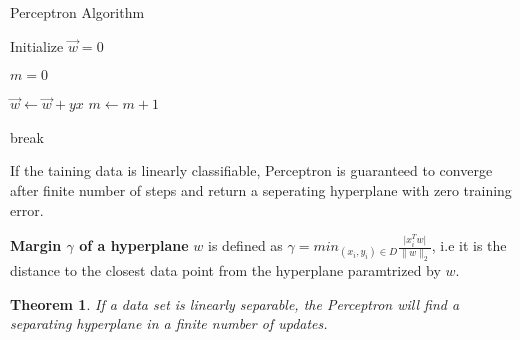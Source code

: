 \documentclass[12pt]{article}
\newtheorem*{thm}{Theorem}
\begin{document}
\begin{algorithm}
	
	\caption*{Perceptron Algorithm} \label{alg:MyAlgorithm}
	\begin{algorithmic}
		\STATE Initialize $\vec{w} = 0$
		
		\STATE $m=0$
		
		
		\STATE $\vec{w} \leftarrow \vec{w} + yx$
		\STATE $m \leftarrow m + 1$
		
		\ENDIF
		\ENDFOR
		
		\STATE break
		
		\ENDIF
		
		
		
		\ENDWHILE
		
	\end{algorithmic}
\end{algorithm}




 If the taining data is linearly classifiable, Perceptron is guaranteed to converge after finite number of steps and return a seperating hyperplane with zero training error.
 

 
 \textbf{Margin $\gamma$ of a hyperplane} $w$ is defined as $\gamma = min_{(x_{i},y_{i})\in D}  \frac{ \vert x_{i}^{T}w \vert}{\|w\|_{2}}$, i.e it is the distance to the closest data point from the hyperplane paramtrized by $w$.
 
 
 
 \begin{thm}If a data set is linearly separable, the Perceptron will find a separating hyperplane in a finite number of updates.\end{thm}
 
\end{document}
